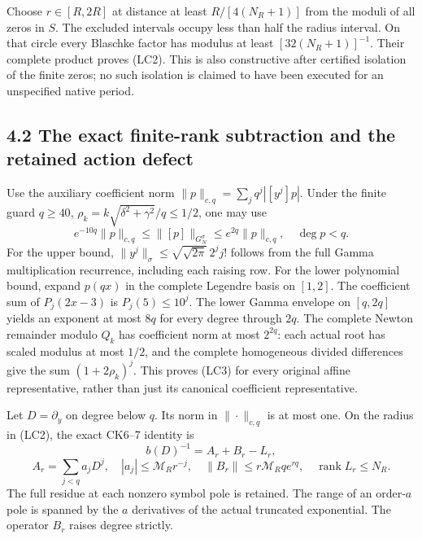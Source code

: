 \documentclass[10pt]{article}
\begin{document}
Choose \(r\in[R,2R]\) at distance at least \(R/[4(N_R+1)]\) from the moduli of all zeros in \(S\). The excluded intervals occupy less than half the radius interval. On that circle every Blaschke factor has modulus at least \([32(N_R+1)]^{-1}\). Their complete product proves (LC2). This is also constructive after certified isolation of the finite zeros; no such isolation is claimed to have been executed for an unspecified native period.

\subsection{4.2 The exact finite-rank subtraction and the retained action defect}\label{the-exact-finite-rank-subtraction-and-the-retained-action-defect}

Use the auxiliary coefficient norm \(\|p\|_{c,q}=\sum_jq^j|[y^j]p|\). Under the finite guard \(q\ge40\), \(\rho_k=k\sqrt{\delta^2+\gamma^2}/q\le1/2\), one may use \[
 \boxed{e^{-10q}\|p\|_{c,q}\le\|[p]\|_{G_N^\sigma}
 \le e^{2q}\|p\|_{c,q},\quad\deg p<q.}
 \tag{LC3}
\] For the upper bound, \(\|y^j\|_\sigma\le\sqrt{\sqrt{2\pi}}\,2^j j!\) follows from the full Gamma multiplication recurrence, including each raising row. For the lower polynomial bound, expand \(p(qx)\) in the complete Legendre basis on \([1,2]\). The coefficient sum of \(P_j(2x-3)\) is \(P_j(5)\le10^j\). The lower Gamma envelope on \([q,2q]\) yields an exponent at most \(8q\) for every degree through \(2q\). The complete Newton remainder modulo \(Q_k\) has coefficient norm at most \(2^{2q}\): each actual root has scaled modulus at most \(1/2\), and the complete homogeneous divided differences give the sum \((1+2\rho_k)^j\). This proves (LC3) for every original affine representative, rather than just its canonical coefficient representative.

Let \(D=\partial_y\) on degree below \(q\). Its norm in \(\|\cdot\|_{c,q}\) is at most one. On the radius in (LC2), the exact CK6--7 identity is \[
 b(D)^{-1}=A_r+B_r-L_r,
\] \[
 A_r=\sum_{j<q}a_jD^j,\quad |a_j|\le\mathcal M_R r^{-j},\quad
 \|B_r\|\le r\mathcal M_R q e^{rq},\quad
 \operatorname{rank}L_r\le N_R.
 \tag{LC4}
\] The full residue at each nonzero symbol pole is retained. The range of an order-\(a\) pole is spanned by the \(a\) derivatives of the actual truncated exponential. The operator \(B_r\) raises degree strictly.
\end{document}
